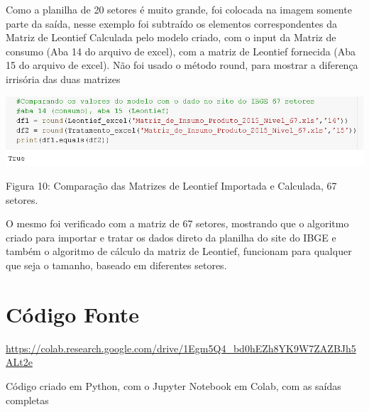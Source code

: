 \documentclass[a4paper, 12pt]{article}
\begin{document}
Como a planilha de 20 setores é muito grande, foi colocada na imagem somente parte da saída, nesse exemplo foi subtraído os elementos correspondentes da Matriz de Leontief Calculada pelo modelo criado, com o input da Matriz de consumo (Aba 14 do arquivo de excel), com a matriz de Leontief fornecida (Aba 15 do arquivo de excel).
Não foi usado o método round, para mostrar a diferença irrisória das duas matrizes

 \begin{center}
    \includegraphics[width=16cm]{saidaExtraB.PNG}
    
    Figura 10: Comparação das Matrizes de Leontief Importada e Calculada, 67 setores.
    
\end{center}

O mesmo foi verificado com a matriz de 67 setores, mostrando que o algoritmo criado para importar e tratar os dados direto da planilha do site do IBGE e também o algoritmo de cálculo da matriz de Leontief, funcionam para qualquer que seja o tamanho, baseado em diferentes setores.

\section{Código Fonte}
\href{https://colab.research.google.com/drive/1Egm5Q4_bd0hEZh8YK9W7ZAZBJh5ALt2e?usp=sharing}{https://colab.research.google.com/drive/1Egm5Q4\_bd0hEZh8YK9W7ZAZBJh5ALt2e}

Código criado em Python, com o Jupyter Notebook em Colab, com as saídas completas
  

\end{document}
